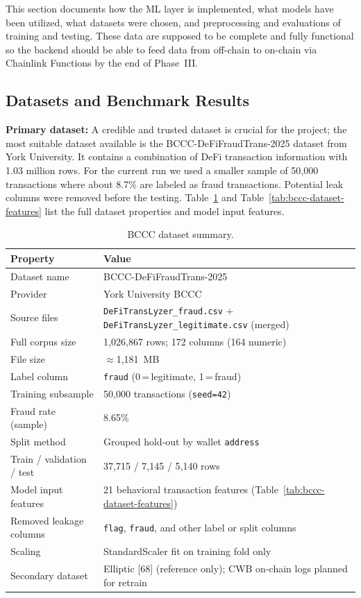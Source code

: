 \documentclass[12pt,a4paper]{report}
\newcommand{\tableheadcolor}{\rowcolor{TableHeadBg}}
\begin{document}
This section documents how the ML layer is implemented, what models have been utilized, what datasets were chosen, and preprocessing and evaluations of training and testing. These data are supposed to be complete and fully functional so the backend should be able to feed data from off-chain to on-chain via Chainlink Functions by the end of Phase~III.

\subsection{Datasets and Benchmark Results}
\label{sec:ml-workload}
\label{sec:ml-explainability}
\label{sec:ml-evaluation}

\textbf{Primary dataset:} A credible and trusted dataset is crucial for the project; the most suitable dataset available is the BCCC-DeFiFraudTrans-2025 dataset from York University. It contains a combination of DeFi transaction information with 1.03 million rows. For the current run we used a smaller sample of 50{,}000 transactions where about 8.7\% are labeled as fraud transactions. Potential leak columns were removed before the testing. Table~\ref{tab:bccc-dataset-summary} and Table~\ref{tab:bccc-dataset-features} list the full dataset properties and model input features.

\begin{table}[H]
\centering
\caption[BCCC dataset summary]{BCCC dataset summary.}
\label{tab:bccc-dataset-summary}
\small
\begin{tabular}{@{}p{3.6cm}p{10.2cm}@{}}
\toprule
\tableheadcolor
\textbf{Property} & \textbf{Value} \\
\midrule
Dataset name & BCCC-DeFiFraudTrans-2025 \\
Provider & York University BCCC \\
Source files & \texttt{DeFiTransLyzer\_fraud.csv} + \texttt{DeFiTransLyzer\_legitimate.csv} (merged) \\
Full corpus size & 1{,}026{,}867 rows; 172 columns (164 numeric) \\
File size & ${\approx}$1{,}181~MB \\
Label column & \texttt{fraud} (0\,=\,legitimate, 1\,=\,fraud) \\
Training subsample & 50{,}000 transactions (\texttt{seed=42}) \\
Fraud rate (sample) & 8.65\% \\
Split method & Grouped hold-out by wallet \texttt{address} \\
Train / validation / test & 37{,}715 / 7{,}145 / 5{,}140 rows \\
Model input features & 21 behavioral transaction features (Table~\ref{tab:bccc-dataset-features}) \\
Removed leakage columns & \texttt{flag}, \texttt{fraud}, and other label or split columns \\
Scaling & StandardScaler fit on training fold only \\
Secondary dataset & Elliptic [68] (reference only); CWB on-chain logs planned for retrain \\
\bottomrule
\end{tabular}
\end{table}
\end{document}
